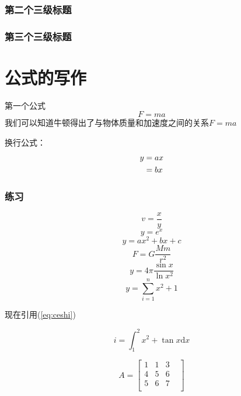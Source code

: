 \documentclass[UTF8]{ctexart}
\begin{document}
	\subsubsection{第二个三级标题}
	
	
	\subsubsection{第三个三级标题}
	
	\section{公式的写作}
	第一个公式
	\begin{equation}
		F=ma
	\end{equation}
	我们可以知道牛顿得出了与物体质量和加速度之间的关系$F=ma$
	
	换行公式：
	\begin{align}
		y &=ax\notag\\
		&=bx
	\end{align}
	
	\subsubsection{练习}
	\begin{equation}
		v=\frac{x}{y}
	\end{equation}
	\begin{equation}
		y=e^{x}
	\end{equation}
	\begin{equation}
		y=ax^2+bx+c
	\end{equation}
	\begin{equation}
		F=G\frac{Mm}{r^2}
	\end{equation}
	\begin{equation}
		y=4\pi \frac{\sin{x}}{\ln{x^2}}
	\end{equation}
	\begin{equation}
		\label{eq:ceshi}
		y=\sum^{n}_{i=1} x^2+1
	\end{equation}
	
	现在引用(\ref{eq:ceshi})
	
	\begin{equation}
		i=\int_{1}^{2}x^2+\tan{x}\mathrm{d}x
	\end{equation}
	
	\begin{equation}
		A=\begin{bmatrix}
			1&1&3\\4&5&6\\5&6&7&\\
		\end{bmatrix}
	\end{equation}
	
\end{document}
